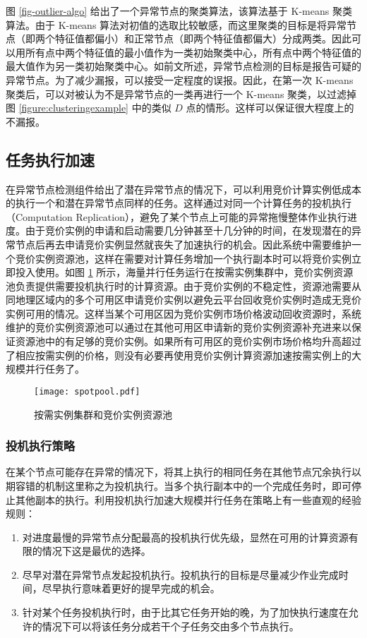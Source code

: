 图 \ref{fig-outlier-algo} 给出了一个异常节点的聚类算法，该算法基于 K-means 聚类算法。由于 K-means 算法对初值的选取比较敏感，而这里聚类的目标是将异常节点（即两个特征值都偏小）和正常节点（即两个特征值都偏大）分成两类。因此可以用所有点中两个特征值的最小值作为一类初始聚类中心，所有点中两个特征值的最大值作为另一类初始聚类中心。如前文所述，异常节点检测的目标是报告可疑的异常节点。为了减少漏报，可以接受一定程度的误报。因此，在第一次 K-means 聚类后，可以对被认为不是异常节点的一类再进行一个 K-means 聚类，以过滤掉图 \ref{figure:clusteringexample} 中的类似 $D$ 点的情形。这样可以保证很大程度上的不漏报。

\subsection{任务执行加速}
在异常节点检测组件给出了潜在异常节点的情况下，可以利用竞价计算实例低成本的执行一个和潜在异常节点同样的任务。这样通过对同一个计算任务的投机执行（Computation Replication），避免了某个节点上可能的异常拖慢整体作业执行进度。由于竞价实例的申请和启动需要几分钟甚至十几分钟的时间，在发现潜在的异常节点后再去申请竞价实例显然就丧失了加速执行的机会。因此系统中需要维护一个竞价实例资源池，这样在需要对计算任务增加一个执行副本时可以将竞价实例立即投入使用。如图 \ref{figure:spotpool} 所示，海量并行任务运行在按需实例集群中，竞价实例资源池负责提供需要投机执行时的计算资源。由于竞价实例的不稳定性，资源池需要从同地理区域内的多个可用区申请竞价实例以避免云平台回收竞价实例时造成无竞价实例可用的情况。这样当某个可用区因为竞价实例市场价格波动回收资源时，系统维护的竞价实例资源池可以通过在其他可用区申请新的竞价实例资源补充进来以保证资源池中的有足够的竞价实例。如果所有可用区的竞价实例市场价格均升高超过了相应按需实例的价格，则没有必要再使用竞价实例计算资源加速按需实例上的大规模并行任务了。
\begin{figure}
  \centering
  \texttt{[image: spotpool.pdf]}
  \caption{按需实例集群和竞价实例资源池}
  \label{figure:spotpool}
\end{figure}

\subsubsection{投机执行策略}
在某个节点可能存在异常的情况下，将其上执行的相同任务在其他节点冗余执行以期容错的机制这里称之为投机执行。当多个执行副本中的一个完成任务时，即可停止其他副本的执行。利用投机执行加速大规模并行任务在策略上有一些直观的经验规则：
\begin{enumerate}
\item 对进度最慢的异常节点分配最高的投机执行优先级，显然在可用的计算资源有限的情况下这是最优的选择。
\item 尽早对潜在异常节点发起投机执行。投机执行的目标是尽量减少作业完成时间，尽早执行意味着更好的提早完成的机会。
\item 针对某个任务投机执行时，由于比其它任务开始的晚，为了加快执行速度在允许的情况下可以将该任务分成若干个子任务交由多个节点执行。
\end{enumerate}

